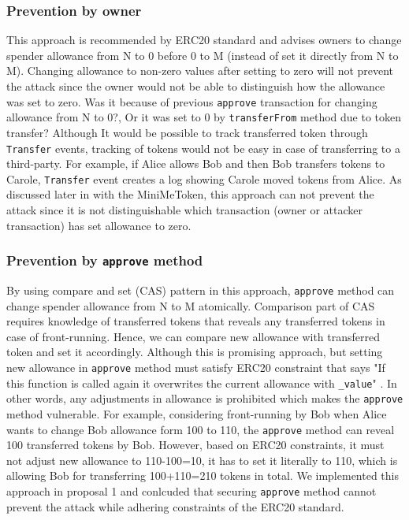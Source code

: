 \subsubsection*{Prevention by owner} This approach is recommended by ERC20 standard \cite{Ref08} and advises owners to change spender allowance from N to 0 before 0 to M (instead of set it directly from N to M). Changing allowance to non-zero values after setting to zero will not prevent the attack since the owner would not be able to distinguish how the allowance was set to zero. Was it because of previous \texttt{approve} transaction for changing allowance from N to 0?, Or it was set to 0 by \texttt{transferFrom} method due to token transfer? Although It would be possible to track transferred token through \texttt{Transfer} events, tracking of tokens would not be easy in case of transferring to a third-party. For example, if Alice allows Bob and then Bob transfers tokens to Carole, \texttt{Transfer} event creates a log showing Carole moved tokens from Alice. As discussed later in with the \textsf{MiniMeToken}, this approach can not prevent the attack since it is not distinguishable which transaction (\ie owner or attacker transaction) has set allowance to zero.
	
\subsubsection*{Prevention by \texttt{approve} method} By using compare and set (CAS) pattern \cite{Ref06} in this approach, \texttt{approve} method can change spender allowance from N to M atomically. Comparison part of CAS requires knowledge of transferred tokens that reveals any transferred tokens in case of front-running. Hence, we can compare new allowance with transferred token and set it accordingly. Although this is promising approach, but setting new allowance in \texttt{approve} method must satisfy ERC20 constraint that says "If this function is called again it overwrites the current allowance with \texttt{\_value}" \cite{Ref08}. In other words, any adjustments in allowance is prohibited which makes the \texttt{approve} method vulnerable. For example, considering front-running by Bob when Alice wants to change Bob allowance form 100 to 110, the \texttt{approve} method can reveal 100 transferred tokens by Bob. However, based on ERC20 constraints, it must not adjust new allowance to 110-100=10, it has to set it literally to 110, which is allowing Bob for transferring 100+110=210 tokens in total. We implemented this approach in proposal 1 and conlcuded that securing \texttt{approve} method cannot prevent the attack while adhering constraints of the ERC20 standard.
	
